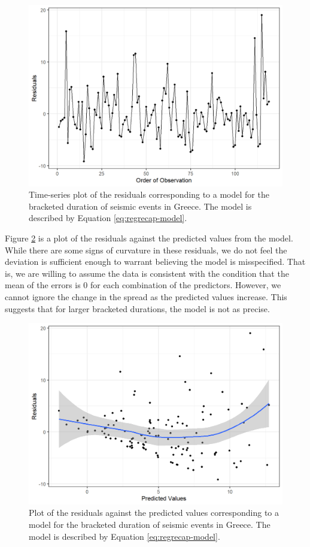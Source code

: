 \documentclass[
]{book}
\theoremstyle{plain}
\theoremstyle{mydefn}
\theoremstyle{myexmpl}
\theoremstyle{remark}
\begin{document}
\begin{figure}

{\centering \includegraphics[width=0.8\linewidth]{./Images/regrecap-indep-1} 

}

\caption{Time-series plot of the residuals corresponding to a model for the bracketed duration of seismic events in Greece. The model is described by Equation \eqref{eq:regrecap-model}.}\label{fig:regrecap-indep}
\end{figure}

Figure \ref{fig:regrecap-mean0} is a plot of the residuals against the predicted values from the model. While there are some signs of curvature in these residuals, we do not feel the deviation is sufficient enough to warrant believing the model is misspecified. That is, we are willing to assume the data is consistent with the condition that the mean of the errors is 0 for each combination of the predictors. However, we cannot ignore the change in the spread as the predicted values increase. This suggests that for larger bracketed durations, the model is not as precise.



\begin{figure}

{\centering \includegraphics[width=0.8\linewidth]{./Images/regrecap-mean0-1} 

}

\caption{Plot of the residuals against the predicted values corresponding to a model for the bracketed duration of seismic events in Greece. The model is described by Equation \eqref{eq:regrecap-model}.}\label{fig:regrecap-mean0}
\end{figure}
\end{document}
